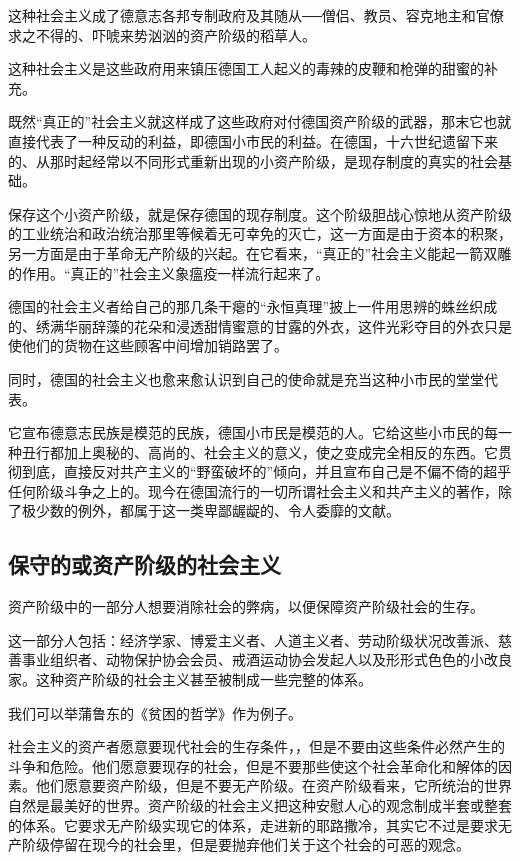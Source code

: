 \documentclass[UTF8]{ctexart}
\begin{document}
这种社会主义成了德意志各邦专制政府及其随从──僧侣、教员、容克地主和官僚求之不得的、吓唬来势汹汹的资产阶级的稻草人。

这种社会主义是这些政府用来镇压德国工人起义的毒辣的皮鞭和枪弹的甜蜜的补充。

既然“真正的”社会主义就这样成了这些政府对付德国资产阶级的武器，那末它也就直接代表了一种反动的利益，即德国小市民的利益。在德国，十六世纪遗留下来的、从那时起经常以不同形式重新出现的小资产阶级，是现存制度的真实的社会基础。

保存这个小资产阶级，就是保存德国的现存制度。这个阶级胆战心惊地从资产阶级的工业统治和政治统治那里等候着无可幸免的灭亡，这一方面是由于资本的积聚，另一方面是由于革命无产阶级的兴起。在它看来，“真正的”社会主义能起一箭双雕的作用。“真正的”社会主义象瘟疫一样流行起来了。

德国的社会主义者给自己的那几条干瘪的“永恒真理”披上一件用思辨的蛛丝织成的、绣满华丽辞藻的花朵和浸透甜情蜜意的甘露的外衣，这件光彩夺目的外衣只是使他们的货物在这些顾客中间增加销路罢了。

同时，德国的社会主义也愈来愈认识到自己的使命就是充当这种小市民的堂堂代表。

它宣布德意志民族是模范的民族，德国小市民是模范的人。它给这些小市民的每一种丑行都加上奥秘的、高尚的、社会主义的意义，使之变成完全相反的东西。它贯彻到底，直接反对共产主义的“野蛮破坏的”倾向，并且宣布自己是不偏不倚的超乎任何阶级斗争之上的。现今在德国流行的一切所谓社会主义和共产主义的著作，除了极少数的例外，都属于这一类卑鄙龌龊的、令人委靡的文献。
\subsection{保守的或资产阶级的社会主义}
资产阶级中的一部分人想要消除社会的弊病，以便保障资产阶级社会的生存。

这一部分人包括：经济学家、博爱主义者、人道主义者、劳动阶级状况改善派、慈善事业组织者、动物保护协会会员、戒酒运动协会发起人以及形形式色色的小改良家。这种资产阶级的社会主义甚至被制成一些完整的体系。

我们可以举蒲鲁东的《贫困的哲学》作为例子。

社会主义的资产者愿意要现代社会的生存条件，，但是不要由这些条件必然产生的斗争和危险。他们愿意要现存的社会，但是不要那些使这个社会革命化和解体的因素。他们愿意要资产阶级，但是不要无产阶级。在资产阶级看来，它所统治的世界自然是最美好的世界。资产阶级的社会主义把这种安慰人心的观念制成半套或整套的体系。它要求无产阶级实现它的体系，走进新的耶路撒冷，其实它不过是要求无产阶级停留在现今的社会里，但是要抛弃他们关于这个社会的可恶的观念。
\end{document}
